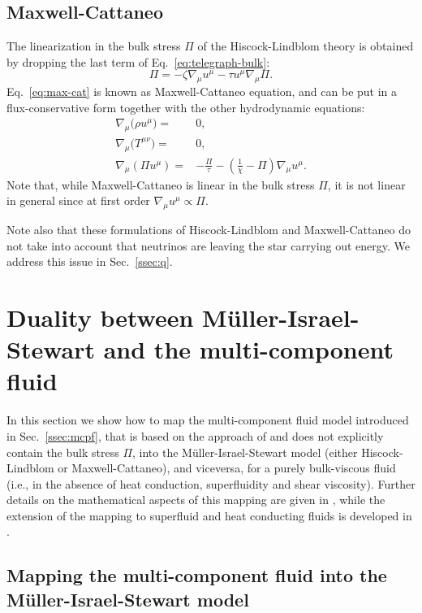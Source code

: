 \documentclass[aps,prd,twocolumn,a4paper,floatfix,nofootbib,superscriptaddress,nofootinbib]{revtex4}
\begin{document}
\subsection{Maxwell-Cattaneo}
\label{ssec:mc}

The linearization in the bulk stress $\Pi$ of the Hiscock-Lindblom theory is obtained
by dropping the last term of Eq.~\eqref{eq:telegraph-bulk}:
%
\begin{equation}
\label{eq:max-cat}
\Pi=-\zeta\nabla_\mu u^\mu - \tau u^\mu\nabla_\mu\Pi.
\end{equation}
%
Eq.~\eqref{eq:max-cat} is known as Maxwell-Cattaneo equation,
and can be put in a flux-conservative form together with the other
hydrodynamic equations:
%
\begin{align}
\label{eq:mc-continuity}
\nabla_\mu \big( \rho u^\mu \big) ={}&0,\\
\label{eq:mc-conservation}
\nabla_\mu\big( T^{\mu \nu}\big)={}&0,\\
\label{eq:maxwell-cattaneo}
\nabla_\mu(\Pi u^\mu)={}&-\frac\Pi\tau -\left(\frac1\chi-\Pi\right)\nabla_\mu u^\mu.
\end{align}
%
Note that, while Maxwell-Cattaneo is linear in the bulk stress $\Pi$,
it is not linear in general since at first order $\nabla_\mu u^\mu\propto \Pi$.

Note also that these formulations of Hiscock-Lindblom and Maxwell-Cattaneo do
not take into account that neutrinos are leaving the star carrying out energy.
We address this issue in Sec.~\ref{ssec:q}.

\section{Duality between M\"uller-Israel-Stewart and the multi-component fluid}
\label{sec:dual1}

In this section we show how to map the multi-component fluid model introduced in
Sec.~\ref{ssec:mcpf}, that is based on the approach of \citet{carter1991} and
does not explicitly contain the bulk stress $\Pi$, into the M\"uller-Israel-Stewart
model (either Hiscock-Lindblom or Maxwell-Cattaneo), and viceversa, for a purely bulk-viscous
fluid (i.e., in the absence of heat conduction, superfluidity and shear
viscosity).  Further details on the mathematical aspects of this
mapping are given in \citet{Gavassino21bulk}, while the extension of the
mapping to superfluid and heat conducting fluids is developed in
\citet{superbulk_PRD_2022}.

\subsection{Mapping the multi-component fluid into the M\"uller-Israel-Stewart model}
\label{ssec:carter2is}
\end{document}
